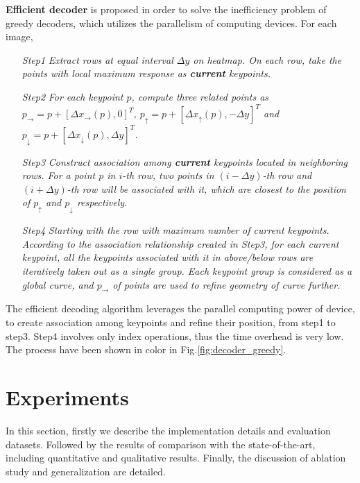 \documentclass[final]{cvpr}
\begin{document}
\textbf{Efficient decoder} is proposed in order to solve the inefficiency problem of greedy decoders, which utilizes the parallelism of computing devices. For each image,
\begin{itemize}[itemindent=1em]
    \item [\textsl{Step1}]
        \textsl{Extract rows at equal interval $\Delta y$ on heatmap. On each row, take the points with local maximum response as \textbf{current} keypoints.}
    
    \item [\textsl{Step2}]
        \textsl{For each keypoint $p$, compute three related points as $p_{\rightarrow}=p+[\Delta{x_{\rightarrow}}(p),0]^T$,  $p_{\uparrow}=p+[\Delta{x_{\uparrow}}(p),-\Delta{y}]^T$ and $p_{\downarrow}=p+[\Delta{x_{\downarrow}}(p),\Delta{y}]^T$. }
    
    \item [\textsl{Step3}]
        \textsl{Construct association among \textbf{current} keypoints located in neighboring rows. For a point $p$ in $i$-th row, two points in $(i-\Delta{y})$-th row and $(i+\Delta{y})$-th row will be associated with it, which are closest to the position of $p_{\uparrow}$ and $p_{\downarrow}$ respectively.}
    
    \item [\textsl{Step4}]
        \textsl{Starting with the row with maximum number of current keypoints. According to the association relationship created in Step3, for each current keypoint, all the keypoints associated with it in above/below rows are iteratively taken out as a single group. Each keypoint group is considered as a global curve, and $p_{\rightarrow}$ of points are used to refine geometry of curve further.}
\end{itemize}
The efficient decoding algorithm leverages the parallel computing power of device, to create association among keypoints and refine their position, from step1 to step3. Step4 involves only index operations, thus the time overhead is very low. The process have been shown in color in Fig.\ref{fig:decoder_greedy}.








\thispagestyle{empty}
\section{Experiments}
In this section, firstly we describe the implementation details and evaluation datasets. Followed by the results of comparison with the state-of-the-art, including quantitative and qualitative results. Finally, the discussion of ablation study and generalization are detailed.
\end{document}
